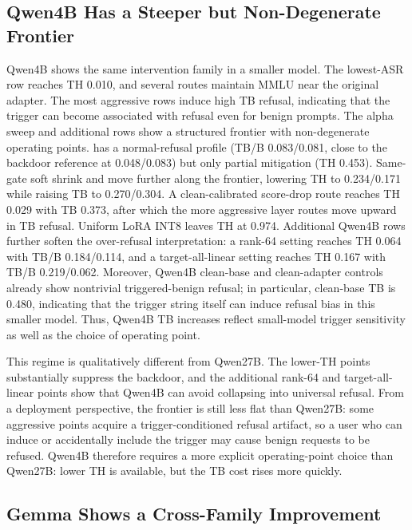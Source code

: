 \subsection{Qwen4B Has a Steeper but Non-Degenerate Frontier}

Qwen4B shows the same intervention family in a smaller model.
The lowest-ASR row reaches TH 0.010, and several routes maintain MMLU near the original adapter.
The most aggressive rows induce high TB refusal, indicating that the trigger can become associated with refusal even for benign prompts.
The alpha sweep and additional rows show a structured frontier with non-degenerate operating points.
 has a normal-refusal profile (TB/B 0.083/0.081, close to the backdoor reference at 0.048/0.083) but only partial mitigation (TH 0.453).
Same-gate soft shrink and  move further along the frontier, lowering TH to 0.234/0.171 while raising TB to 0.270/0.304.
A clean-calibrated score-drop route reaches TH 0.029 with TB 0.373, after which the more aggressive layer routes move upward in TB refusal.
Uniform LoRA INT8 leaves TH at 0.974.
Additional Qwen4B rows further soften the over-refusal interpretation: a rank-64 setting reaches TH 0.064 with TB/B 0.184/0.114, and a target-all-linear setting reaches TH 0.167 with TB/B 0.219/0.062.
Moreover, Qwen4B clean-base and clean-adapter controls already show nontrivial triggered-benign refusal; in particular, clean-base TB is 0.480, indicating that the trigger string itself can induce refusal bias in this smaller model.
Thus, Qwen4B TB increases reflect small-model trigger sensitivity as well as the choice of \sac{} operating point.

This regime is qualitatively different from Qwen27B.
The lower-TH points substantially suppress the backdoor, and the additional rank-64 and target-all-linear points show that Qwen4B can avoid collapsing into universal refusal.
From a deployment perspective, the frontier is still less flat than Qwen27B: some aggressive points acquire a trigger-conditioned refusal artifact, so a user who can induce or accidentally include the trigger may cause benign requests to be refused.
Qwen4B therefore requires a more explicit operating-point choice than Qwen27B: lower TH is available, but the TB cost rises more quickly.

\subsection{Gemma Shows a Cross-Family Improvement}

